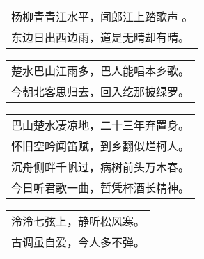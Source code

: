 \nopagebreak%
\nopagebreak%
\noindent\begin{minipage}{\linewidth}
  \vskip-3pt\begin{table}[H]
    \centering
    \begin{tabular}{@{}l@{}}
杨柳青青江水平，闻郎江上踏歌声 。\\
东边日出西边雨，道是无晴却有晴。
    \end{tabular}
  \end{table}
\end{minipage}
\vspace{1cm}


\nopagebreak%
\nopagebreak%
\noindent\begin{minipage}{\linewidth}
  \vskip-3pt\begin{table}[H]
    \centering
    \begin{tabular}{@{}l@{}}
楚水巴山江雨多，巴人能唱本乡歌。\\
今朝北客思归去，回入纥那披绿罗。
    \end{tabular}
  \end{table}
\end{minipage}
\vspace{1cm}


\nopagebreak%
\nopagebreak%
\noindent\begin{minipage}{\linewidth}
  \vskip-3pt\begin{table}[H]
    \centering
    \begin{tabular}{@{}l@{}}
巴山楚水凄凉地，二十三年弃置身。\\
怀旧空吟闻笛赋，到乡翻似烂柯人。\\
沉舟侧畔千帆过，病树前头万木春。\\
今日听君歌一曲，暂凭杯酒长精神。
    \end{tabular}
  \end{table}
\end{minipage}
\vspace{1cm}


\nopagebreak%
\nopagebreak%
\noindent\begin{minipage}{\linewidth}
  \vskip-3pt\begin{table}[H]
    \centering
    \begin{tabular}{@{}l@{}}
泠泠七弦上，静听松风寒。\\
古调虽自爱，今人多不弹。
    \end{tabular}
  \end{table}
\end{minipage}
\vspace{1cm}


